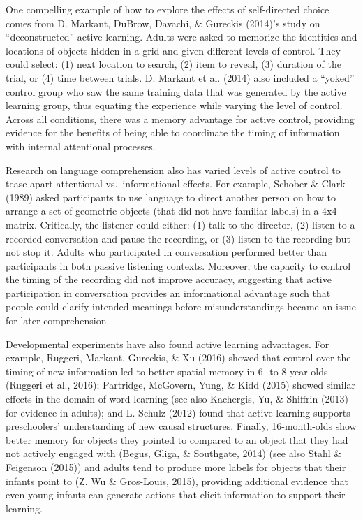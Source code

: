 \documentclass[oneside]{report}
\begin{document}
One compelling example of how to explore the effects of self-directed
choice comes from D. Markant, DuBrow, Davachi, \& Gureckis (2014)'s
study on ``deconstructed'' active learning. Adults were asked to
memorize the identities and locations of objects hidden in a grid and
given different levels of control. They could select: (1) next location
to search, (2) item to reveal, (3) duration of the trial, or (4) time
between trials. D. Markant et al. (2014) also included a ``yoked''
control group who saw the same training data that was generated by the
active learning group, thus equating the experience while varying the
level of control. Across all conditions, there was a memory advantage
for active control, providing evidence for the benefits of being able to
coordinate the timing of information with internal attentional
processes.

Research on language comprehension also has varied levels of active
control to tease apart attentional vs.~informational effects. For
example, Schober \& Clark (1989) asked participants to use language to
direct another person on how to arrange a set of geometric objects (that
did not have familiar labels) in a 4x4 matrix. Critically, the listener
could either: (1) talk to the director, (2) listen to a recorded
conversation and pause the recording, or (3) listen to the recording but
not stop it. Adults who participated in conversation performed better
than participants in both passive listening contexts. Moreover, the
capacity to control the timing of the recording did not improve
accuracy, suggesting that active participation in conversation provides
an informational advantage such that people could clarify intended
meanings before misunderstandings became an issue for later
comprehension.

Developmental experiments have also found active learning advantages.
For example, Ruggeri, Markant, Gureckis, \& Xu (2016) showed that
control over the timing of new information led to better spatial memory
in 6- to 8-year-olds (Ruggeri et al., 2016); Partridge, McGovern, Yung,
\& Kidd (2015) showed similar effects in the domain of word learning
(see also Kachergis, Yu, \& Shiffrin (2013) for evidence in adults); and
L. Schulz (2012) found that active learning supports preschoolers'
understanding of new causal structures. Finally, 16-month-olds show
better memory for objects they pointed to compared to an object that
they had not actively engaged with (Begus, Gliga, \& Southgate, 2014)
(see also Stahl \& Feigenson (2015)) and adults tend to produce more
labels for objects that their infants point to (Z. Wu \& Gros-Louis,
2015), providing additional evidence that even young infants can
generate actions that elicit information to support their learning.
\end{document}
